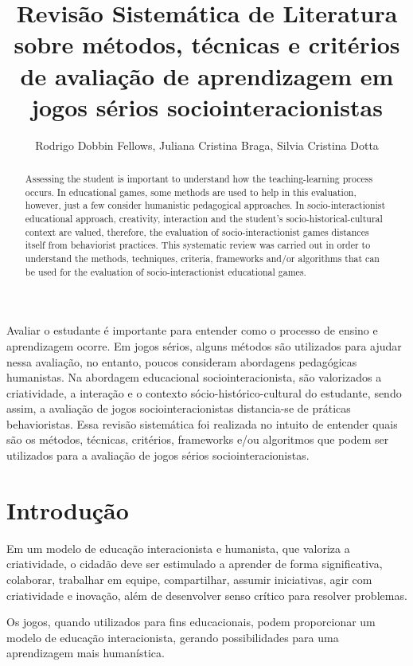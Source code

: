 \documentclass[12pt]{article}
\title{Revisão Sistemática de Literatura sobre métodos, técnicas e critérios de avaliação de aprendizagem em jogos sérios sociointeracionistas}
\author{Rodrigo Dobbin Fellows\inst{1}, Juliana Cristina Braga\inst{1}, Silvia Cristina Dotta\inst{1}}
\begin{document}
 

\maketitle

\begin{abstract}
Assessing the student is important to understand how the teaching-learning process occurs. In educational games, some methods are used to help in this evaluation, however, just a few consider humanistic pedagogical approaches. In socio-interactionist educational approach, creativity, interaction and the student's socio-historical-cultural context are valued, therefore, the evaluation of socio-interactionist games distances itself from behaviorist practices. This systematic review was carried out in order to understand the methods, techniques, criteria, frameworks and/or algorithms that can be used for the evaluation of socio-interactionist educational games.
\end{abstract}
     
\begin{resumo}
Avaliar o estudante é importante para entender como o processo de ensino e aprendizagem ocorre. Em jogos sérios, alguns métodos são utilizados para ajudar nessa avaliação, no entanto, poucos consideram abordagens pedagógicas humanistas. Na abordagem educacional sociointeracionista, são valorizados a criatividade, a interação e o contexto sócio-histórico-cultural do estudante, sendo assim, a avaliação de jogos sociointeracionistas distancia-se de práticas behavioristas. Essa revisão sistemática foi realizada no intuito de entender quais são os métodos, técnicas, critérios, frameworks e/ou algoritmos que podem ser utilizados para a avaliação de jogos sérios sociointeracionistas.
\end{resumo}

\section{Introdução}\label{sec:introducao}

Em um modelo de educação interacionista e humanista, que valoriza a criatividade, o cidadão deve ser estimulado a aprender de forma significativa, colaborar, trabalhar em equipe, compartilhar, assumir iniciativas, agir com criatividade e inovação, além de desenvolver senso crítico para resolver problemas.

Os jogos, quando utilizados para fins educacionais, podem proporcionar um modelo de educação interacionista, gerando possibilidades para uma aprendizagem mais humanística. 
\end{document}
